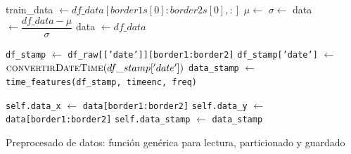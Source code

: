 \begin{algorithm}[!ht]
\begin{algorithmic}[1]
		
		\State train\_data $\gets df\_data[border1s[0]:border2s[0], :]$
		\State $\mu \gets$ 
		\State $\sigma \gets$ 
		\State data $\gets \dfrac{df\_data - \mu}{\sigma}$
		\Else
		\State data $\gets df\_data$
		\EndIf
		
		
		\State \texttt{df\_stamp} $\gets$ \texttt{df\_raw[['date']][border1:border2]}
		\State \texttt{df\_stamp['date']}  $\gets$ $\Call{convertirDateTime}{df\_stamp['date']}$
		\State \texttt{data\_stamp} $\gets$ \texttt{time\_features(df\_stamp, timeenc, freq)}
		
		
		\State \texttt{self.data\_x} $\gets$ \texttt{data[border1:border2]}
		\State \texttt{self.data\_y} $\gets$ \texttt{data[border1:border2]}
		\State \texttt{self.data\_stamp} $\gets$ \texttt{data\_stamp}
		
		\EndProcedure
	\end{algorithmic}
	\caption{Preprocesado de datos: función genérica para lectura, particionado y guardado}
	\label{preproc}
\end{algorithm}


